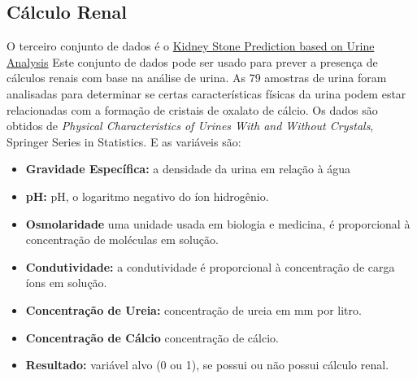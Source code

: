 \subsection{Cálculo Renal}
O terceiro conjunto de dados é o \href{https://www.kaggle.com/datasets/vuppalaadithyasairam/kidney-stone-prediction-based-on-urine-analysis}{Kidney Stone Prediction based on Urine Analysis}
Este conjunto de dados pode ser usado para prever a presença de cálculos renais com base na análise de urina. As 79 amostras de urina foram analisadas para
determinar se certas características físicas da urina podem estar relacionadas com a
formação de cristais de oxalato de cálcio. Os dados são obtidos de \textit{Physical Characteristics of Urines With and Without Crystals}, Springer Series in Statistics. E as variáveis são:
\begin{itemize}
    \item \textbf{Gravidade Específica:} a densidade da urina em relação à água
    \item \textbf{pH:} pH, o logaritmo negativo do íon hidrogênio.
    \item \textbf{Osmolaridade} uma unidade usada em biologia e medicina, é proporcional à concentração de moléculas em solução.
    \item \textbf{Condutividade:} a condutividade é proporcional à concentração de carga íons em solução.
    \item \textbf{Concentração de Ureia:} concentração de ureia em mm por litro.
    \item \textbf{Concentração de Cálcio} concentração de cálcio.
    \item \textbf{Resultado:} variável alvo (0 ou 1), se possui ou não possui cálculo renal.
\end{itemize}



